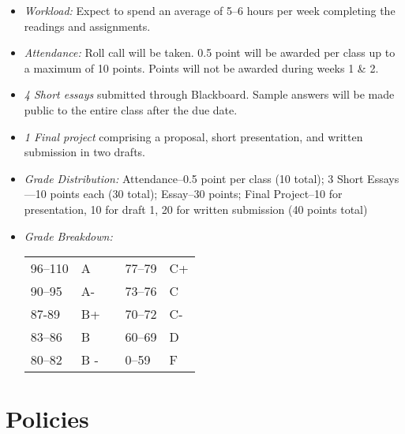 \documentclass[article,oneside]{memoir}
\begin{document}
\begin{itemize}
\item \textit{Workload:} Expect to spend an average of 5--6 hours per week  completing the readings and assignments.

\item \textit{Attendance:} Roll call will be taken. 0.5 point will be awarded per class up to a maximum of 10 points. Points will not be awarded during weeks 1 \& 2. 

\item \textit{4 Short essays} submitted through Blackboard. Sample answers will be made public to the entire class after the due date. 
 
\item \textit{1 Final project} comprising a proposal, short presentation, and written submission in two drafts.



\item \textit{Grade Distribution:} Attendance--0.5 point per class (10 total); 3 Short Essays---10 points each (30 total); Essay--30 points; Final Project--10 for presentation, 10 for draft 1, 20 for written submission (40 points total)

\item \textit{Grade Breakdown:}

 \begin{tabular}{ | l | l | p{2cm} | l | l | }
    \hline 
96--110 & A  & &  77--79 &  C+ \\  
90--95 & A- & &  73--76 & C \\
87-89 & B+ &  &  70--72 & C- \\ 
83--86 & B  & &  60--69 & D\\
80--82 & B - & & 0--59 & F\\ \hline
    \end{tabular}


\end{itemize}





\section{Policies}
\end{document}
